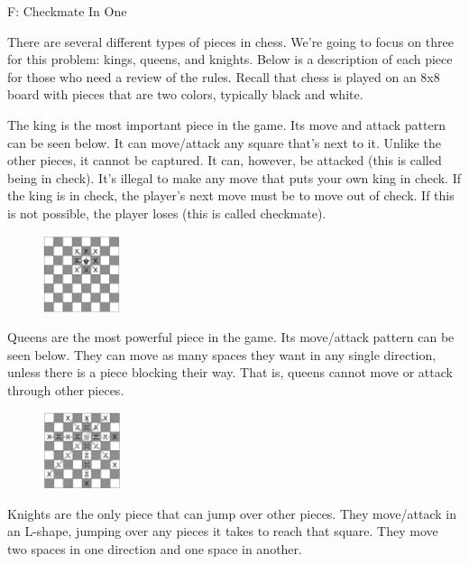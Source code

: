 \begin{problem}{F: Checkmate In One}

There are several different types of pieces in chess. We're going to focus on three for this problem: kings, queens, and knights. Below is a description of each piece for those who need a review of the rules. Recall that chess is played on an 8x8 board with pieces that are two colors, typically black and white.

The king is the most important piece in the game. Its move and attack pattern can be seen below. It can move/attack any square that's next to it. Unlike the other pieces, it cannot be captured. It can, however, be attacked (this is called being in check). It's illegal to make any move that puts your own king in check. If the king is in check, the player's next move must be to move out of check. If this is not possible, the player loses (this is called checkmate).

\begin{figure}[h]
    \centering
    \includegraphics[width=0.2\textwidth]{king-moves.eps}
\end{figure}

Queens are the most powerful piece in the game. Its move/attack pattern can be seen below. They can move as many spaces they want in any single direction, unless there is a piece blocking their way. That is, queens cannot move or attack through other pieces.

\begin{figure}[h]
    \centering
    \includegraphics[width=0.2\textwidth]{queen-moves.eps}
\end{figure}

Knights are the only piece that can jump over other pieces. They move/attack in an L-shape, jumping over any pieces it takes to reach that square. They move two spaces in one direction and one space in another.


\end{problem}

